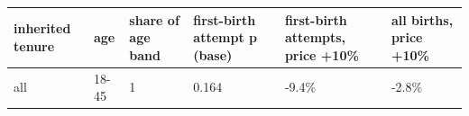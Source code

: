 \begingroup\small
\setlength{\tabcolsep}{3pt}
\renewcommand{\arraystretch}{1.04}
\begin{tabularx}{\linewidth}{XXXXXX}
\toprule
inherited tenure & age & share of age band & first-birth attempt p (base) & first-birth attempts, price +10\% & all births, price +10\% \\
\midrule
all & 18-45 & 1 & 0.164 & -9.4\% & -2.8\% \\
\bottomrule
\end{tabularx}
\endgroup
